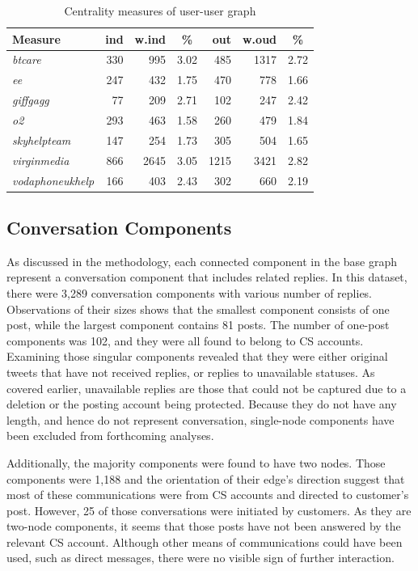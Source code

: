 \documentclass[sigconf]{acmart}
\begin{document}
{\begin{table}[!h]
\centering
\begin{tabularx}{\columnwidth}{l|rrc|rrc}
\toprule
\textbf{Measure} & \textbf{ind} & \textbf{w.ind} & \textbf{\%} & \textbf{out} & \textbf{w.oud} & \textbf{\%}\\ 
\midrule
{\emph{btcare}} & 330 & 995 & 3.02 & 485 & 1317 & 2.72\\
{\emph{ee}} & 247 & 432 & 1.75 & 470 & 778 & 1.66 \\
{\emph{giffgagg}} & 77 & 209 & 2.71 & 102 & 247 & 2.42 \\ 
{\emph{o2}} & 293 & 463 & 1.58 & 260 & 479 & 1.84 \\
{\emph{skyhelpteam}} & 147 & 254 & 1.73 & 305 & 504 & 1.65\\
{\emph{virginmedia}} & 866 & 2645 & 3.05 & 1215 & 3421 & 2.82\\
{\emph{vodaphoneukhelp}} & 166 & 403 & 2.43 & 302 & 660 & 2.19\\
\bottomrule
\end{tabularx}
\caption{Centrality measures of user-user graph}
\label{tbl:uucentralitymeasures}
\end{table}


\subsection{Conversation Components}

As discussed in the methodology, each connected component in the base
graph represent a conversation component that includes related
replies. In this dataset, there were 3,289 conversation components
with various number of replies. Observations of their sizes shows that
the smallest component consists of one post, while the largest
component contains 81 posts. The number of one-post components was
102, and they were all found to belong to CS accounts. Examining those
singular components revealed that they were either original tweets
that have not received replies, or replies to unavailable statuses. As
covered earlier, unavailable replies are those that could not be
captured due to a deletion or the posting account being
protected. Because they do not have any length, and hence do not
represent conversation, single-node components have been excluded from
forthcoming analyses.

Additionally, the majority components were found to have two
nodes. Those components were 1,188 and the orientation of their edge's
direction suggest that most of these communications were from CS
accounts and directed to customer's post. However, 25 of those
conversations were initiated by customers.  As they are two-node
components, it seems that those posts have not been answered by the
relevant CS account. Although other means of communications could have
been used, such as direct messages, there were no visible sign of
further interaction.

}
\end{document}
